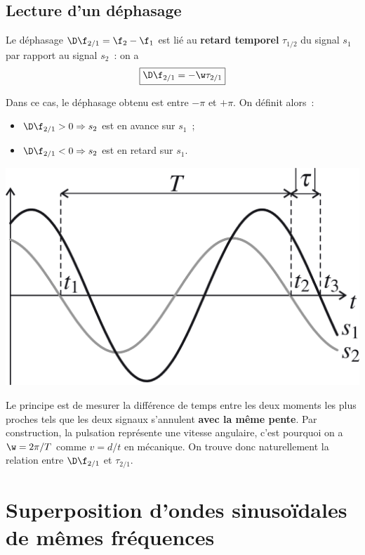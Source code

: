 \documentclass[../../main/main.tex]{subfiles}
\begin{document}
\subsection{Lecture d'un déphasage}
Le déphasage $\D\f_{2/1} = \f_2 - \f_1$ est lié au \textbf{retard temporel}
$\tau_{1/2}$ du signal $s_1$ par rapport au signal $s_2$~: on a
\[\boxed{\D\f_{2/1} = -\w\tau_{2/1}}\]

\begin{minipage}{0.70\linewidth}
	Dans ce cas, le déphasage obtenu est entre $-\pi$ et $+\pi$. On définit alors~:
	\begin{itemize}
		\item $\D\f_{2/1} > 0 \Rightarrow s_2$ est en avance sur $s_1$~;
		\item $\D\f_{2/1} < 0 \Rightarrow s_2$ est en retard sur $s_1$.
	\end{itemize}
\end{minipage}
\begin{minipage}{0.30\linewidth}
	\begin{center}
		\includegraphics[width=\linewidth]{dfretard}
	\end{center}
\end{minipage}

Le principe est de mesurer la différence de temps entre les deux moments les
plus proches tels que les deux signaux s'annulent \textbf{avec la même pente}.
Par construction, la pulsation représente une vitesse angulaire, c'est pourquoi
on a $\w = 2\pi/T$ comme $v = d/t$ en mécanique. On trouve donc naturellement la
relation entre $\D\f_{2/1}$ et $\tau_{2/1}$.

\section{Superposition d'ondes sinuso\"idales de mêmes fréquences}
\end{document}
